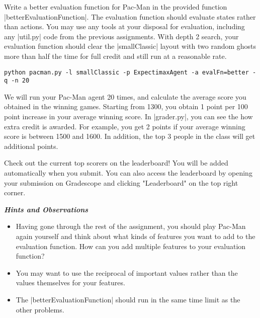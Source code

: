 \item {}
Write a better evaluation function for Pac-Man in the provided function
|betterEvaluationFunction|. The evaluation function should evaluate states
rather than actions. You may use any tools at your disposal for evaluation,
including any |util.py| code from the previous assignments. With depth 2 search,
your evaluation function should clear the |smallClassic| layout with two random
ghosts more than half the time for full credit and still run at a reasonable
rate.

\begin{lstlisting}
python pacman.py -l smallClassic -p ExpectimaxAgent -a evalFn=better -q -n 20
\end{lstlisting}

We will run your Pac-Man agent 20 times, and calculate the average score you
obtained in the winning games. Starting from 1300, you obtain 1 point per 100
point increase in your average winning score. In |grader.py|, you can see the
how extra credit is awarded. For example, you get 2 points if your average
winning score is between 1500 and 1600. In addition, the top 3 people in the
class will get additional points.

Check out the current top scorers on the leaderboard! You will be added
automatically when you submit. You can also access the leaderboard by opening
your submission on Gradescope and clicking "Leaderboard" on the top right
corner.

{\bf {\em Hints and Observations}}
\begin{itemize}
  \item Having gone through the rest of the assignment, you should play Pac-Man
  again yourself and think about what kinds of features you want to add to the
  evaluation function. How can you add multiple features to your evaluation
  function?
  \item You may want to use the reciprocal of important values rather than the
  values themselves for your features.
  \item The |betterEvaluationFunction| should run in the same time limit as the
  other problems.
\end{itemize}

